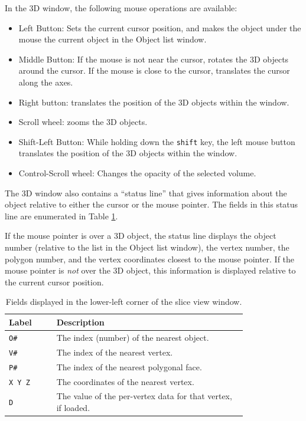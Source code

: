 \documentclass[11pt,letterpaper]{article}
\newcommand{\ident}[1]{{\tt #1}}
\begin{document}
In the 3D window, the following mouse operations are available:

\begin{itemize}
\item Left Button: Sets the current cursor position, and makes the 
object under the mouse the current object in the Object list window.
\item Middle Button: If the mouse is not near the cursor, rotates the 3D
objects around the cursor. If the mouse is close to the cursor, translates
the cursor along the axes.
\item Right button: translates the position of the 3D objects within the
window.
\item Scroll wheel: zooms the 3D objects.
\item Shift-Left Button: While holding down the \ident{shift} key, the
 left mouse button translates the position of the 3D objects within
 the window.
\item Control-Scroll wheel: Changes the opacity of the selected volume.
\end{itemize}

The 3D window also contains a ``status line'' that gives information about
the object relative to either the cursor or the mouse pointer. The fields
in this status line are enumerated in Table \ref{tab3DFields}.

If the mouse pointer is over a 3D object, the status line displays the
object number (relative to the list in the Object list window), the
vertex number, the polygon number, and the vertex coordinates closest
to the mouse pointer. If the mouse pointer is {\em not} over the 3D
object, this information is displayed relative to the current cursor
position.

\begin{table}
\centering
\caption{Fields displayed in the lower-left corner of the slice view window.}
\begin{tabular}{lp{0.8\linewidth}}
Label & Description \\
\hline
\ident{O\#} & The index (number) of the nearest object. \\
\ident{V\#} & The index of the nearest vertex. \\
\ident{P\#} & The index of the nearest polygonal face. \\
\ident{X Y Z} & The coordinates of the nearest vertex. \\
\ident{D} & The value of the per-vertex data for that vertex, if loaded. \\
\hline
\end{tabular}
\label{tab3DFields}
\end{table}
\end{document}
